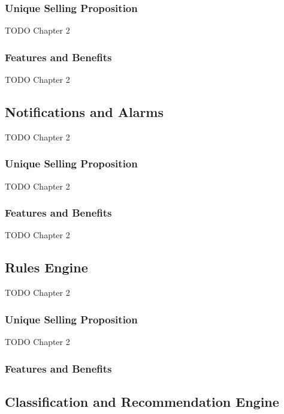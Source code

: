 \subsubsection*{Unique Selling Proposition}
TODO Chapter 2

\subsubsection*{Features and Benefits}
TODO Chapter 2


\subsection{Notifications and Alarms}
TODO Chapter 2

\subsubsection*{Unique Selling Proposition}
TODO Chapter 2

\subsubsection*{Features and Benefits}
TODO Chapter 2


\subsection{Rules Engine}
TODO Chapter 2

\subsubsection*{Unique Selling Proposition}

TODO Chapter 2

\subsubsection*{Features and Benefits}


\subsection{Classification and Recommendation Engine}

